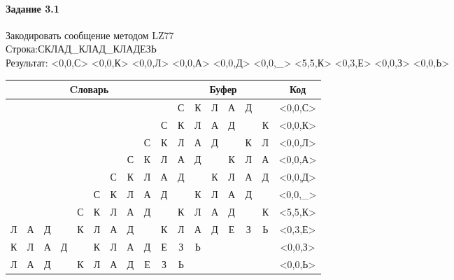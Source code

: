 \documentclass[a4paper, 12pt]{article}
\begin{document}
\pagebreak
\paragraph{Задание 3.1}

Закодировать сообщение методом LZ77\\
Строка:СКЛАД\_КЛАД\_КЛАДЕЗЬ\\
Результат: <0,0,С> <0,0,К> <0,0,Л> <0,0,А> <0,0,Д> <0,0,\_> <5,5,К> <0,3,Е> <0,0,З> <0,0,Ь>\\
\begin{table}[h!]
\centering
\begin{tabular}{|c|c|c|c|c|c|c|c|c|c|c|c|c|c|c|c|c|} 
\hline
\multicolumn{10}{|c|}{Cловарь} & \multicolumn{6}{c|}{Буфер} & Код  \\ \hline
  &   &   &   &   &   &   &   &   &   & \cellcolor[HTML]{8CE4F6} С & К & Л & А & Д &   & <0,0,С>
\\ \hline
  &   &   &   &   &   &   &   &   & С & \cellcolor[HTML]{8CE4F6} К & Л & А & Д &   & К & <0,0,К>
\\ \hline
  &   &   &   &   &   &   &   & С & К & \cellcolor[HTML]{8CE4F6} Л & А & Д &   & К & Л & <0,0,Л>
\\ \hline
  &   &   &   &   &   &   & С & К & Л & \cellcolor[HTML]{8CE4F6} А & Д &   & К & Л & А & <0,0,А>
\\ \hline
  &   &   &   &   &   & С & К & Л & А & \cellcolor[HTML]{8CE4F6} Д &   & К & Л & А & Д & <0,0,Д>
\\ \hline
  &   &   &   &   & С & К & Л & А & Д & \cellcolor[HTML]{8CE4F6}   & К & Л & А & Д &   & <0,0,\_>
\\ \hline
  &   &   &   & С & \cellcolor[HTML]{FFFF00} К & \cellcolor[HTML]{FFFF00} Л & \cellcolor[HTML]{FFFF00} А & \cellcolor[HTML]{FFFF00} Д & \cellcolor[HTML]{FFFF00}   & \cellcolor[HTML]{FFFF00} К & \cellcolor[HTML]{FFFF00} Л & \cellcolor[HTML]{FFFF00} А & \cellcolor[HTML]{FFFF00} Д & \cellcolor[HTML]{FFFF00}   & \cellcolor[HTML]{8CE4F6} К & <5,5,К>
\\ \hline
\cellcolor[HTML]{FFFF00} Л & \cellcolor[HTML]{FFFF00} А & \cellcolor[HTML]{FFFF00} Д &   & К & Л & А & Д &   & К & \cellcolor[HTML]{FFFF00} Л & \cellcolor[HTML]{FFFF00} А & \cellcolor[HTML]{FFFF00} Д & \cellcolor[HTML]{8CE4F6} Е & З & Ь & <0,3,Е>
\\ \hline
К & Л & А & Д &   & К & Л & А & Д & Е & \cellcolor[HTML]{8CE4F6} З & Ь &   &   &   &   & <0,0,З>
\\ \hline
Л & А & Д &   & К & Л & А & Д & Е & З & \cellcolor[HTML]{8CE4F6} Ь &   &   &   &   &   & <0,0,Ь>
\\ \hline
\end{tabular}
\end{table}
\end{document}
